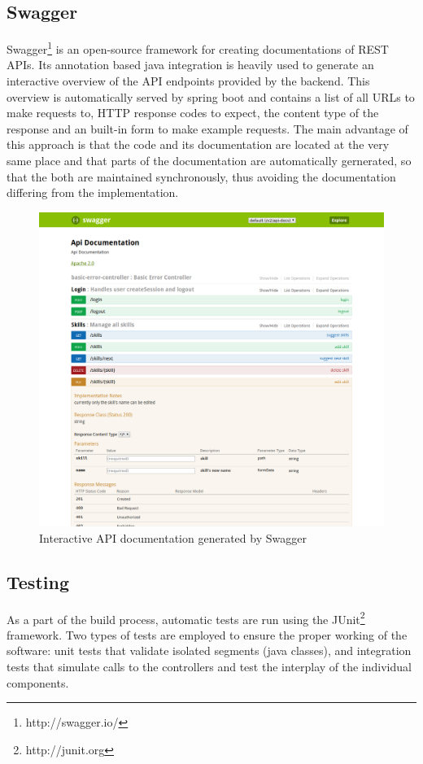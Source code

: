 \subsection{Swagger}
Swagger\footnote{http://swagger.io/} is an open-source framework for creating documentations of REST APIs.
Its annotation based java integration is heavily used to generate an interactive overview of the API endpoints provided by the
backend. This overview is automatically served by spring boot and contains a list of all URLs to make requests to, HTTP response codes to expect, the content type of the response and an built-in form to make example requests. The main advantage of this approach is that the code and its documentation are located at the very same place and that parts of the documentation are automatically gernerated, so that the both are maintained synchronously, thus avoiding the documentation differing from the implementation.
\begin{figure}[!htp]
    \centering
    \includegraphics[width=\textwidth]{images/swagger_ui.png}
    \caption[Swagger Interactive Documentation]{Interactive API documentation generated by Swagger}
    \label{fig:markovchain}
\end{figure}

\subsection{Testing}
As a part of the build process, automatic tests are run using the JUnit\footnote{http://junit.org} framework. Two types of tests are employed to ensure the proper working of the software: unit tests that validate isolated segments (java classes), and integration tests that simulate calls to the controllers and test the
interplay of the individual components.

